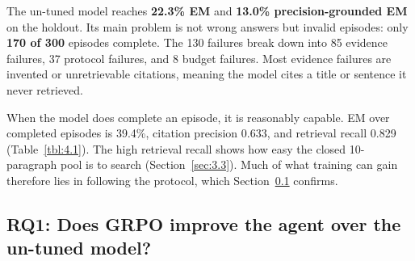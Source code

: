 The un-tuned model reaches \textbf{22.3\% EM} and \textbf{13.0\%
precision-grounded EM} on the holdout. Its main problem is not wrong
answers but invalid episodes: only \textbf{170 of 300} episodes
complete. The 130 failures break down into 85 evidence failures, 37
protocol failures, and 8 budget failures. Most evidence failures are
invented or unretrievable citations, meaning the model cites a title or
sentence it never retrieved.

When the model does complete an episode, it is reasonably capable. EM
over completed episodes is 39.4\%, citation precision 0.633, and
retrieval recall 0.829 (Table~\ref{tbl:4.1}). The high retrieval recall
shows how easy the closed 10-paragraph pool is to search
(Section~\ref{sec:3.3}). Much of what training can gain therefore lies
in following the protocol, which Section~\ref{sec:4.3} confirms.

\subsection{RQ1: Does GRPO improve the agent over the un-tuned
model?}\label{sec:4.3}

